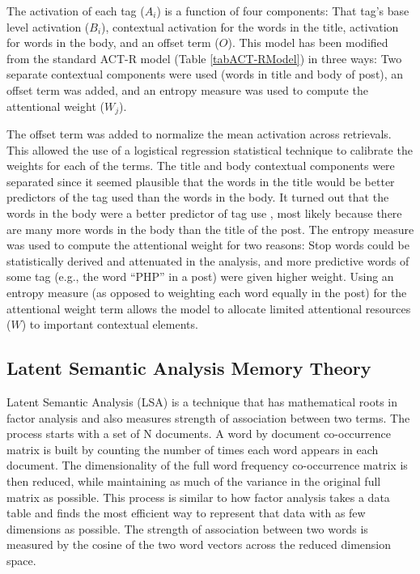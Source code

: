 \documentclass[man,floatsintext,donotrepeattitle]{apa6}
\begin{document}
The activation of each tag ($A_{i}$) is a function of four components:
That tag's base level activation ($B_{i}$), contextual activation for the words in the title, activation for words in the body, and an offset term ($O$).
This model has been modified from the standard ACT-R model (Table \ref{tabACT-RModel}) in three ways:
Two separate contextual components were used (words in title and body of post), an offset term was added, and an entropy measure was used to compute the attentional weight ($W_{j}$).

The offset term was added to normalize the mean activation across retrievals.
This allowed the use of a logistical regression statistical technique to calibrate the weights for each of the terms.
The title and body contextual components were separated since it seemed plausible that the words in the title would be better predictors of the tag used than the words in the body.
It turned out that the words in the body were a better predictor of tag use \parencite{Stanley2013}, most likely because there are many more words in the body than the title of the post.
The entropy measure was used to compute the attentional weight for two reasons:
Stop words could be statistically derived and attenuated in the analysis, and more predictive words of some tag (e.g., the word ``PHP'' in a post) were given higher weight.
Using an entropy measure (as opposed to weighting each word equally in the post) for the attentional weight term allows the model to allocate limited attentional resources ($W$) to important contextual elements.

\subsection{Latent Semantic Analysis Memory Theory}

Latent Semantic Analysis \parencite{Landauer1997} (LSA) is a technique that has mathematical roots in factor analysis and also measures strength of association between two terms.
The process starts with a set of N documents.
A word by document co-occurrence matrix is built by counting the number of times each word appears in each document.
The dimensionality of the full word frequency co-occurrence matrix is then reduced, while maintaining as much of the variance in the original full matrix as possible.
This process is similar to how factor analysis takes a data table and finds the most efficient way to represent that data with as few dimensions as possible.
The strength of association between two words is measured by the cosine of the two word vectors across the reduced dimension space.
\end{document}
